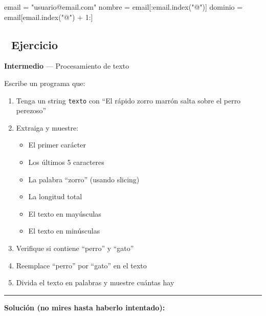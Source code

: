 \documentclass[
  doc,
  floatsintext,
  longtable,
  a4paper,
  nolmodern,
  notxfonts,
  notimes,
  12pt,
  colorlinks=true,linkcolor=blue,citecolor=blue,urlcolor=blue]{apa7}
\newenvironment{Shaded}{\begin{snugshade}}{\end{snugshade}}
\newcommand{\DecValTok}[1]{\textcolor[rgb]{0.68,0.00,0.00}{#1}}
\newcommand{\NormalTok}[1]{\textcolor[rgb]{0.00,0.23,0.31}{#1}}
\newcommand{\OperatorTok}[1]{\textcolor[rgb]{0.37,0.37,0.37}{#1}}
\newcommand{\StringTok}[1]{\textcolor[rgb]{0.13,0.47,0.30}{#1}}
\providecommand{\tightlist}{%
  \setlength{\itemsep}{0pt}\setlength{\parskip}{0pt}}
\begin{document}
\begin{enumerate}
\begin{Shaded}
\begin{Highlighting}[]
\NormalTok{email }\OperatorTok{=} \StringTok{"usuario@email.com"}
\NormalTok{nombre }\OperatorTok{=}\NormalTok{ email[:email.index(}\StringTok{"@"}\NormalTok{)]}
\NormalTok{dominio }\OperatorTok{=}\NormalTok{ email[email.index(}\StringTok{"@"}\NormalTok{) }\OperatorTok{+} \DecValTok{1}\NormalTok{:]}
\end{Highlighting}
\end{Shaded}
\end{enumerate}

\subsection{📝 Ejercicio}\label{ejercicio}

\textbf{Intermedio} --- Procesamiento de texto

Escribe un programa que:

\begin{enumerate}
\def\labelenumi{\arabic{enumi}.}
\tightlist
\item
  Tenga un string \texttt{texto} con ``El rápido zorro marrón salta
  sobre el perro perezoso''
\item
  Extraiga y muestre:

  \begin{itemize}
  \tightlist
  \item
    El primer carácter
  \item
    Los últimos 5 caracteres
  \item
    La palabra ``zorro'' (usando slicing)
  \item
    La longitud total
  \item
    El texto en mayúsculas
  \item
    El texto en minúsculas
  \end{itemize}
\item
  Verifique si contiene ``perro'' y ``gato''
\item
  Reemplace ``perro'' por ``gato'' en el texto
\item
  Divida el texto en palabras y muestre cuántas hay
\end{enumerate}

\begin{center}\rule{0.5\linewidth}{0.5pt}\end{center}

\textbf{Solución (no mires hasta haberlo intentado):}
\end{document}
